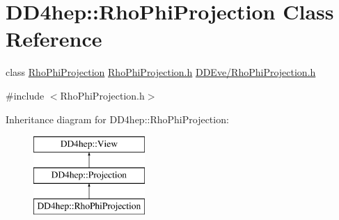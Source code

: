 \hypertarget{class_d_d4hep_1_1_rho_phi_projection}{}\section{D\+D4hep\+:\+:Rho\+Phi\+Projection Class Reference}
\label{class_d_d4hep_1_1_rho_phi_projection}


class \hyperlink{class_d_d4hep_1_1_rho_phi_projection}{Rho\+Phi\+Projection} \hyperlink{_rho_phi_projection_8h}{Rho\+Phi\+Projection.\+h} \hyperlink{_rho_phi_projection_8h}{D\+D\+Eve/\+Rho\+Phi\+Projection.\+h}  




{\ttfamily \#include $<$Rho\+Phi\+Projection.\+h$>$}

Inheritance diagram for D\+D4hep\+:\+:Rho\+Phi\+Projection\+:\begin{figure}[H]
\begin{center}
\leavevmode
\includegraphics[height=3.000000cm]{class_d_d4hep_1_1_rho_phi_projection}
\end{center}
\end{figure}
